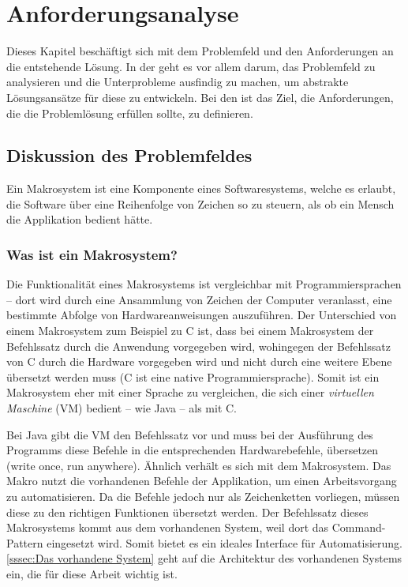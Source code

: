 \section{An\-for\-de\-rungs\-ana\-ly\-se}
\label{sec:Anforderungsanalyse}
  Dieses Kapitel beschäftigt sich mit dem Problemfeld und den Anforderungen an die entstehende Lösung. In der  geht es vor allem darum, das Problemfeld zu analysieren und die Unterprobleme ausfindig zu machen, um abstrakte Lösungsansätze für diese zu entwickeln. Bei den  ist das Ziel, die Anforderungen, die die Problemlösung erfüllen sollte, zu definieren.

  \subsection{Diskussion des Problemfeldes}
  \label{ssec:Diskussion des Problemfeldes}
    Ein Makrosystem ist eine Komponente eines Softwaresystems, welche es erlaubt, die Software über eine Reihenfolge von Zeichen so zu steuern, als ob ein Mensch die Applikation bedient hätte.

    \subsubsection{Was ist ein Makrosystem?}
    \label{sssec:Was ist ein Makrosystem?}
      Die Funktionalität eines Makrosystems ist vergleichbar mit Programmiersprachen -- dort wird durch eine Ansammlung von Zeichen der Computer veranlasst, eine bestimmte Abfolge von Hardwareanweisungen auszuführen. Der Unterschied von einem Makrosystem zum Beispiel zu C ist, dass bei einem Makrosystem der Befehlssatz durch die Anwendung vorgegeben wird, wohingegen der Befehlssatz von C durch die Hardware vorgegeben wird und nicht durch eine weitere Ebene übersetzt werden muss (C ist eine native Programmiersprache). Somit ist ein Makrosystem eher mit einer Sprache zu vergleichen, die sich einer \emph{virtuellen Maschine} (VM) bedient -- wie Java -- als mit C.

      Bei Java gibt die VM den Befehlssatz vor und muss bei der Ausführung des Programms diese Befehle in die entsprechenden Hardwarebefehle, übersetzen (write once, run anywhere). Ähnlich verhält es sich mit dem Makrosystem. Das Makro nutzt die vorhandenen Befehle der Applikation, um einen Arbeitsvorgang zu automatisieren. Da die Befehle jedoch nur als Zeichenketten vorliegen, müssen diese zu den richtigen Funktionen übersetzt werden. Der Befehlssatz dieses Makrosystems kommt aus dem vorhandenen System, weil dort das Command-Pattern \autocite[S.263]{Gamma:1995:DPE:186897} eingesetzt wird. Somit bietet es ein ideales Interface für Automatisierung. \autoref{sssec:Das vorhandene System} geht auf die Architektur des vorhandenen Systems ein, die für diese Arbeit wichtig ist.

